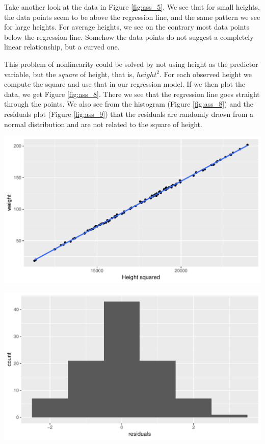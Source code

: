 \documentclass[]{report}\usepackage[]{graphicx}\usepackage[]{color}
\makeatletter
\def\maxwidth{ %
  \ifdim\Gin@nat@width>\linewidth
    \linewidth
  \else
    \Gin@nat@width
  \fi
}
\newenvironment{knitrout}{}{} %
\makeatother
\begin{document}
Take another look at the data in Figure \ref{fig:ass_5}. We see that for small heights, the data points seem to be above the regression line, and the same pattern we see for large heights. For average heights, we see on the contrary most data points below the regression line. Somehow the data points do not suggest a completely linear relationship, but a curved one. 

This problem of nonlinearity could be solved by not using height as the predictor variable, but the \textit{square} of height, that is, $height^2$. For each observed height we compute the square and use that in our regression model. If we then plot the data, we get Figure \ref{fig:ass_8}. There we see that the regression line goes straight through the points. We also see from the histogram (Figure \ref{fig:ass_8}) and the residuals plot (Figure \ref{fig:ass_9}) that the residuals are randomly drawn from a normal distribution and are not related to the square of height. 

\begin{knitrout}
\color{fgcolor}

{\centering \includegraphics[width=\maxwidth]{figure/ass_7b-1} 

}



\end{knitrout}

\begin{knitrout}
\color{fgcolor}

{\centering \includegraphics[width=\maxwidth]{figure/ass_8-1} 

}



\end{knitrout}
\end{document}

